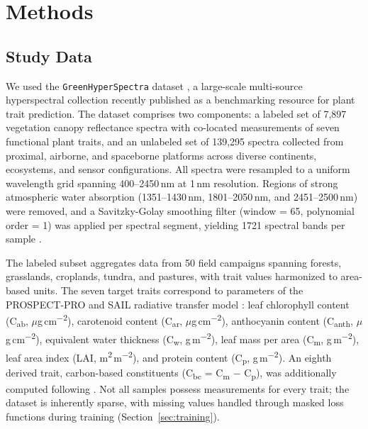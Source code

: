 \section{Methods}
\label{sec:methods}

\subsection{Study Data}
\label{sec:data}

We used the \texttt{GreenHyperSpectra} dataset \citep{cherif2025greenhyperspectra}, a large-scale multi-source hyperspectral collection recently published as a benchmarking resource for plant trait prediction. The dataset comprises two components: a labeled set of 7,897 vegetation canopy reflectance spectra with co-located measurements of seven functional plant traits, and an unlabeled set of 139,295 spectra collected from proximal, airborne, and spaceborne platforms across diverse continents, ecosystems, and sensor configurations. All spectra were resampled to a uniform wavelength grid spanning 400--2450\,nm at 1\,nm resolution. Regions of strong atmospheric water absorption (1351--1430\,nm, 1801--2050\,nm, and 2451--2500\,nm) were removed, and a Savitzky-Golay smoothing filter (window = 65, polynomial order = 1) was applied per spectral segment, yielding 1721 spectral bands per sample \citep{cherif2025greenhyperspectra}.

The labeled subset aggregates data from 50 field campaigns spanning forests, grasslands, croplands, tundra, and pastures, with trait values harmonized to area-based units. The seven target traits correspond to parameters of the PROSPECT-PRO and SAIL radiative transfer model \citep{feret2021prospectpro}: leaf chlorophyll content (C\textsubscript{ab}, $\mu$g\,cm\textsuperscript{$-$2}), carotenoid content (C\textsubscript{ar}, $\mu$g\,cm\textsuperscript{$-$2}), anthocyanin content (C\textsubscript{anth}, $\mu$g\,cm\textsuperscript{$-$2}), equivalent water thickness (C\textsubscript{w}, g\,m\textsuperscript{$-$2}), leaf mass per area (C\textsubscript{m}, g\,m\textsuperscript{$-$2}), leaf area index (LAI, m\textsuperscript{2}\,m\textsuperscript{$-$2}), and protein content (C\textsubscript{p}, g\,m\textsuperscript{$-$2}). An eighth derived trait, carbon-based constituents (C\textsubscript{bc} = C\textsubscript{m} $-$ C\textsubscript{p}), was additionally computed following \citet{cherif2025greenhyperspectra}. Not all samples possess measurements for every trait; the dataset is inherently sparse, with missing values handled through masked loss functions during training (Section~\ref{sec:training}).


